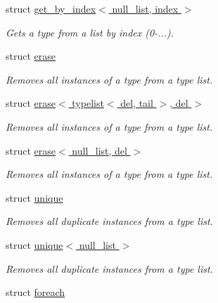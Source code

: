\begin{DoxyCompactItemize}
struct \hyperlink{structavrpp_1_1typelist_1_1get__by__index_3_01null__list_00_01index_01_4}{get\_\-by\_\-index$<$ null\_\-list, index $>$}
\begin{DoxyCompactList}\small\item\em Gets a type from a list by index (0-\/...). \item\end{DoxyCompactList}\item 
struct \hyperlink{structavrpp_1_1typelist_1_1erase}{erase}
\begin{DoxyCompactList}\small\item\em Removes all instances of a type from a type list. \item\end{DoxyCompactList}\item 
struct \hyperlink{structavrpp_1_1typelist_1_1erase_3_01typelist_3_01del_00_01tail_01_4_00_01del_01_4}{erase$<$ typelist$<$ del, tail $>$, del $>$}
\begin{DoxyCompactList}\small\item\em Removes all instances of a type from a type list. \item\end{DoxyCompactList}\item 
struct \hyperlink{structavrpp_1_1typelist_1_1erase_3_01null__list_00_01del_01_4}{erase$<$ null\_\-list, del $>$}
\begin{DoxyCompactList}\small\item\em Removes all instances of a type from a type list. \item\end{DoxyCompactList}\item 
struct \hyperlink{structavrpp_1_1typelist_1_1unique}{unique}
\begin{DoxyCompactList}\small\item\em Removes all duplicate instances from a type list. \item\end{DoxyCompactList}\item 
struct \hyperlink{structavrpp_1_1typelist_1_1unique_3_01null__list_01_4}{unique$<$ null\_\-list $>$}
\begin{DoxyCompactList}\small\item\em Removes all duplicate instances from a type list. \item\end{DoxyCompactList}\item 
struct \hyperlink{structavrpp_1_1typelist_1_1foreach}{foreach}

\end{DoxyCompactItemize}

